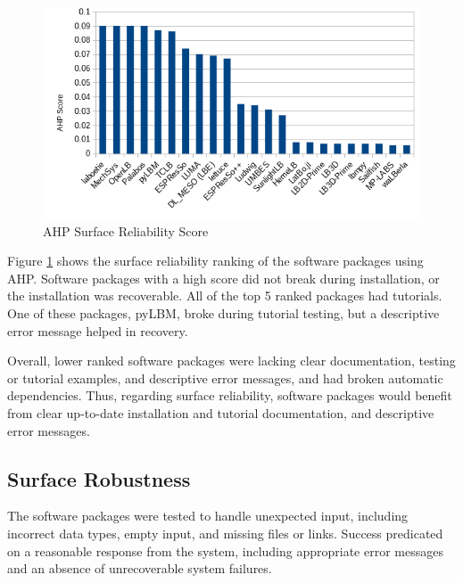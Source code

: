 \documentclass[12pt, notitlepage]{article}
\begin{document}
\begin{figure}[h!]
	\begin{center}
		\includegraphics[width=1.0\textwidth]{reliability_chart}
		\caption{AHP Surface Reliability Score}
		\label{Fig_Reliability}
	\end{center}
\end{figure}

Figure \ref{Fig_Reliability} shows the surface reliability ranking of the software packages using AHP. Software packages with a high score did not break during installation, or the installation was recoverable. All of the top 5 ranked packages had tutorials. One of these packages, pyLBM, broke during tutorial testing, but a descriptive error message helped in recovery.

Overall, lower ranked software packages were lacking clear documentation, testing or tutorial examples, and descriptive error messages, and had broken automatic dependencies. Thus, regarding surface reliability, software packages would benefit from clear up-to-date installation and tutorial documentation, and descriptive error messages.

\subsection{Surface Robustness}

The software packages were tested to handle unexpected input, including incorrect data types, empty input, and missing files or links. Success predicated on a reasonable response from the system, including appropriate error messages and an absence of unrecoverable system failures. 
\end{document}
